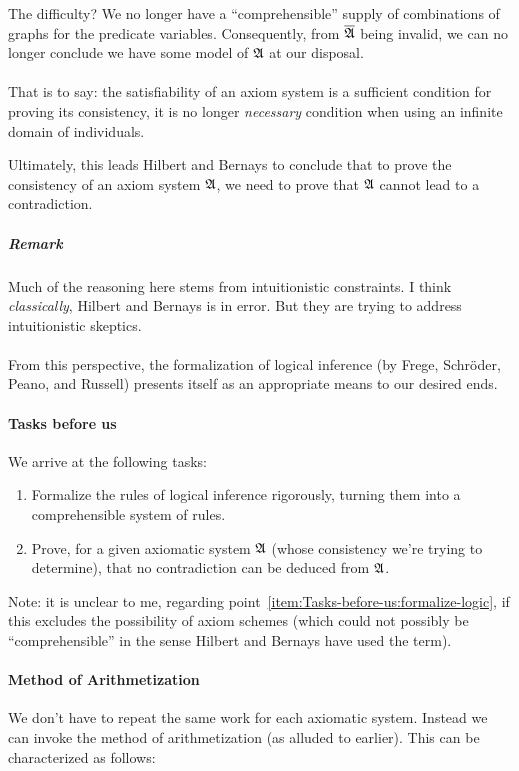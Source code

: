 The difficulty? We no longer have a ``comprehensible'' supply of
combinations of graphs for the predicate variables. Consequently, from
$\overline{\mathfrak{A}}$ being invalid, we can no longer conclude we have some
model of $\mathfrak{A}$ at our disposal.

\paragraph{}
That is to say: the satisfiability of an axiom system is a sufficient
condition for proving its consistency, it is no longer
\emph{necessary} condition when using an infinite domain of individuals.

Ultimately, this leads Hilbert and Bernays to conclude that to prove
the consistency of an axiom system $\mathfrak{A}$, we need to prove that
$\mathfrak{A}$ cannot lead to a contradiction.

\subparagraph{Remark}
Much of the reasoning here stems from intuitionistic constraints. I
think \emph{classically}, Hilbert and Bernays is in error. But they
are trying to address intuitionistic skeptics.

\paragraph{}
From this perspective, the formalization of logical inference (by
Frege, Schr\"{o}der, Peano, and Russell) presents itself as an
appropriate means to our desired ends. 

\paragraph{Tasks before us}
We arrive at the following tasks:
\begin{enumerate}
\item\label{item:Tasks-before-us:formalize-logic}%
Formalize the rules of logical inference rigorously, turning
  them into a comprehensible system of rules.
\item Prove, for a given axiomatic system $\mathfrak{A}$ (whose
  consistency we're trying to determine), that no contradiction can be
  deduced from $\mathfrak{A}$.
\end{enumerate}
Note: it is unclear to me, regarding
point~\ref{item:Tasks-before-us:formalize-logic}, if this excludes
the possibility of axiom schemes (which could not possibly be
``comprehensible'' in the sense Hilbert and Bernays have used the term).

\paragraph{Method of Arithmetization}
We don't have to repeat the same work for each axiomatic system.
Instead we can invoke the method of arithmetization (as alluded to
earlier). This can be characterized as follows:

